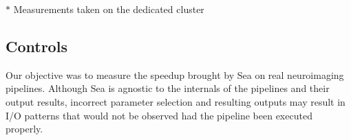 \documentclass[fleqn,10pt]{wlscirep}
\begin{document}
    

    
    \begin{table}[t]
      \small\centering
    \footnotesize{$*$ Measurements taken on the dedicated cluster}
    \caption{Pipeline execution characteristics based on the processing of a single fMRI image using a single application process}
    \label{table:seaneuro-pipelines}
  \end{table}

    \subsection{Controls}
    Our objective was to measure the speedup brought by Sea on real neuroimaging
    pipelines. Although Sea is agnostic to the internals of the pipelines and
    their output results, incorrect parameter selection and resulting outputs
    may result in I/O patterns that would not be observed had the pipeline been
    executed properly.
   
\end{document}
